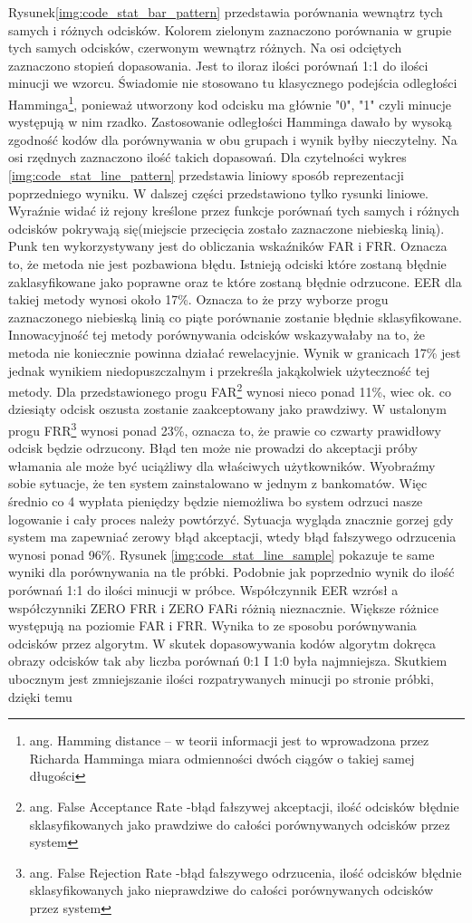 Rysunek\ref{img:code_stat_bar_pattern} przedstawia porównania wewnątrz tych samych i różnych odcisków. Kolorem zielonym zaznaczono porównania w grupie tych samych odcisków, czerwonym wewnątrz różnych. Na osi odciętych zaznaczono stopień dopasowania. Jest to iloraz ilości porównań 1:1 do ilości minucji we wzorcu. Świadomie nie stosowano tu klasycznego podejścia odległości Hamminga\footnote{ang. Hamming distance – w teorii informacji jest to wprowadzona przez Richarda Hamminga miara odmienności dwóch ciągów o takiej samej długości}, ponieważ utworzony kod odcisku ma głównie "0", "1" czyli minucje występują w nim rzadko. Zastosowanie odległości Hamminga dawało by wysoką zgodność kodów dla porównywania w obu grupach i wynik byłby nieczytelny. Na osi rzędnych zaznaczono ilość takich dopasowań. Dla czytelności wykres \ref{img:code_stat_line_pattern} przedstawia liniowy sposób reprezentacji poprzedniego wyniku. W dalszej części przedstawiono tylko rysunki liniowe. Wyraźnie widać iż rejony kreślone przez funkcje porównań tych samych i różnych odcisków pokrywają się(miejscie przecięcia zostało zaznaczone niebieską linią). Punk ten wykorzystywany jest do obliczania wskaźników FAR i FRR. Oznacza to, że metoda nie jest pozbawiona błędu. Istnieją odciski które zostaną błędnie zaklasyfikowane jako poprawne oraz te które zostaną błędnie odrzucone. EER dla takiej metody wynosi około 17\%. Oznacza to że przy wyborze progu zaznaczonego niebieską linią co piąte porównanie zostanie błędnie sklasyfikowane. Innowacyjność tej metody porównywania odcisków wskazywałaby na to, że metoda nie koniecznie powinna działać rewelacyjnie. Wynik w granicach 17\% jest jednak wynikiem niedopuszczalnym i przekreśla jakąkolwiek użyteczność tej metody. Dla przedstawionego progu FAR\footnote{ang. False Acceptance Rate -błąd fałszywej akceptacji, ilość odcisków błędnie sklasyfikowanych jako prawdziwe do całości porównywanych odcisków przez system} wynosi nieco ponad 11\%, wiec ok. co dziesiąty odcisk oszusta zostanie zaakceptowany jako prawdziwy. W ustalonym progu FRR\footnote{ang. False Rejection Rate -błąd fałszywego odrzucenia, ilość odcisków błędnie sklasyfikowanych jako nieprawdziwe do całości porównywanych odcisków przez system} wynosi ponad 23\%, oznacza to, że prawie co czwarty prawidłowy odcisk będzie odrzucony. Błąd ten może nie prowadzi do akceptacji próby włamania ale może być uciążliwy dla właściwych użytkowników. Wyobraźmy sobie sytuacje, że ten system zainstalowano w jednym z bankomatów. Więc średnio co 4 wypłata pieniędzy będzie niemożliwa bo system odrzuci nasze logowanie i cały proces należy powtórzyć. Sytuacja wygląda znacznie gorzej gdy system ma zapewniać zerowy błąd akceptacji, wtedy błąd fałszywego odrzucenia wynosi ponad 96\%. Rysunek \ref{img:code_stat_line_sample} pokazuje te same wyniki dla porównywania na tle próbki. Podobnie jak poprzednio wynik do ilość porównań 1:1 do ilości minucji w próbce. Współczynnik EER wzrósł a współczynniki ZERO FRR i ZERO FARi różnią  nieznacznie. Większe różnice występują na poziomie FAR i FRR. Wynika to ze sposobu porównywania odcisków przez algorytm. W skutek dopasowywania kodów algorytm dokręca obrazy odcisków tak aby liczba porównań 0:1 I 1:0 była najmniejsza. Skutkiem ubocznym jest zmniejszanie ilości rozpatrywanych minucji po stronie próbki, dzięki temu 